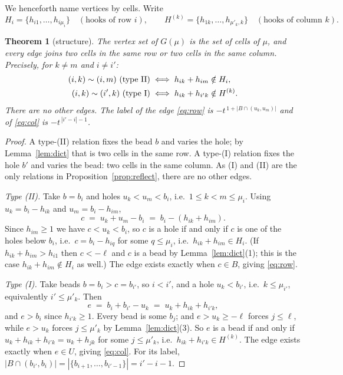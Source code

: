 \documentclass[11pt]{article}
\newtheorem{theorem}{Theorem}[section]
\theoremstyle{definition}
\begin{document}
We henceforth name vertices by cells. Write
\[
   H_i=\{h_{i1},\dots,h_{i\mu_i}\} \quad(\text{hooks of row } i), \qquad
   H^{(k)}=\{h_{1k},\dots,h_{\mu'_k,k}\}\quad(\text{hooks of column } k).
\]

\begin{theorem}[structure]\label{thm:struct}
The vertex set of $G(\mu)$ is the set of cells of $\mu$, and every edge joins two cells in the
same row or two cells in the same column. Precisely, for $k\ne m$ and $i\ne i'$:
\begin{align}
  (i,k)\sim(i,m) \ \text{\textup{(type II)}} &\iff h_{ik}+h_{im}\notin H_i, \label{eq:row}\\
  (i,k)\sim(i',k)\ \text{\textup{(type I)}} &\iff h_{ik}+h_{i'k}\notin H^{(k)}. \label{eq:col}
\end{align}
There are no other edges. The label of the edge \eqref{eq:row} is $-t^{\,1+|B\cap(u_k,u_m)|}$
and of \eqref{eq:col} is $-t^{\,|i'-i|-1}$.
\end{theorem}

\begin{proof}
A type-(II) relation fixes the bead $b$ and varies the hole; by Lemma~\ref{lem:dict} that is
two cells in the same row. A type-(I) relation fixes the hole $b'$ and varies the bead: two
cells in the same column. As (I) and (II) are the only relations in
Proposition~\ref{prop:reflect}, there are no other edges.

\emph{Type \textup{(II)}.} Take $b=b_i$ and holes $u_k<u_m<b_i$, i.e.\ $1\le k<m\le\mu_i$.
Using $u_k=b_i-h_{ik}$ and $u_m=b_i-h_{im}$,
\[
   c \;=\; u_k+u_m-b_i \;=\; b_i-(h_{ik}+h_{im}).
\]
Since $h_{im}\ge1$ we have $c<u_k<b_i$, so $c$ is a hole if and only if $c$ is one of the holes
below $b_i$, i.e.\ $c=b_i-h_{iq}$ for some $q\le\mu_i$, i.e.\ $h_{ik}+h_{im}\in H_i$. (If
$h_{ik}+h_{im}>h_{i1}$ then $c<-\ell$ and $c$ is a bead by Lemma~\ref{lem:dict}(1); this is the
case $h_{ik}+h_{im}\notin H_i$ as well.) The edge exists exactly when $c\in B$, giving
\eqref{eq:row}.

\emph{Type \textup{(I)}.} Take beads $b=b_i>c=b_{i'}$, so $i<i'$, and a hole $u_k<b_{i'}$,
i.e.\ $k\le\mu_{i'}$, equivalently $i'\le\mu'_k$. Then
\[
   e \;=\; b_i+b_{i'}-u_k \;=\; u_k+h_{ik}+h_{i'k},
\]
and $e>b_i$ since $h_{i'k}\ge1$. Every bead is some $b_j$; and $e>u_k\ge-\ell$ forces $j\le\ell$,
while $e>u_k$ forces $j\le\mu'_k$ by Lemma~\ref{lem:dict}(3). So $e$ is a bead if and only if
$u_k+h_{ik}+h_{i'k}=u_k+h_{jk}$ for some $j\le\mu'_k$, i.e.\ $h_{ik}+h_{i'k}\in H^{(k)}$. The
edge exists exactly when $e\in U$, giving \eqref{eq:col}. For its label,
$|B\cap(b_{i'},b_i)|=|\{b_{i+1},\dots,b_{i'-1}\}|=i'-i-1$.
\end{proof}
\end{document}

